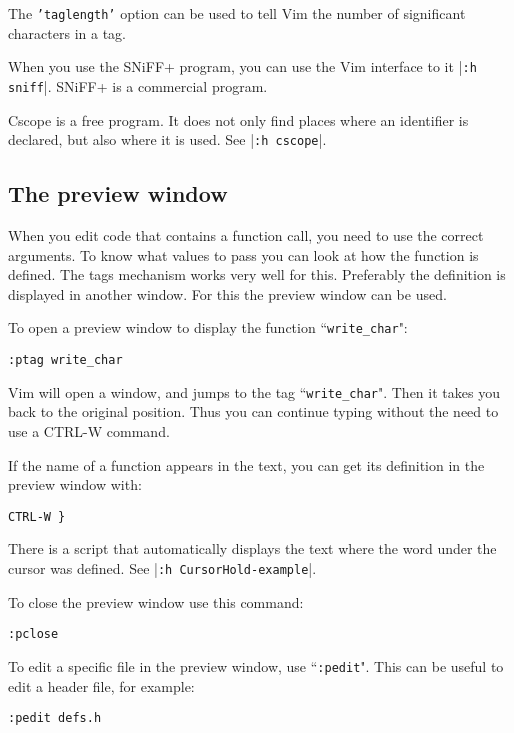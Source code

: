 The \texttt{'taglength'} option can be used to tell Vim the number of significant characters in a tag.

When you use the SNiFF+ program, you can use the Vim interface to it |\texttt{:h sniff}|.
SNiFF+ is a commercial program.

Cscope is a free program.
It does not only find places where an identifier is declared, but also where it is used.
See |\texttt{:h cscope}|.
\subsection{The preview window}
When you edit code that contains a function call, you need to use the correct arguments.
To know what values to pass you can look at how the function is defined.
The tags mechanism works very well for this.
Preferably the definition is displayed in another window.
For this the preview window can be used.

To open a preview window to display the function ``\texttt{write\_char}":

\begin{Verbatim}[samepage=true]
 :ptag write_char
\end{Verbatim}

Vim will open a window, and jumps to the tag ``\texttt{write\_char}".
Then it takes you back to the original position.
Thus you can continue typing without the need to use a CTRL-W command.

If the name of a function appears in the text, you can get its definition in the preview window with:

\begin{Verbatim}[samepage=true]
 CTRL-W }
\end{Verbatim}

There is a script that automatically displays the text where the word under the cursor was defined.
See |\texttt{:h CursorHold-example}|.

To close the preview window use this command:

\begin{Verbatim}[samepage=true]
 :pclose
\end{Verbatim}

To edit a specific file in the preview window, use ``\texttt{:pedit}".
This can be useful to edit a header file, for example:

\begin{Verbatim}[samepage=true]
 :pedit defs.h
\end{Verbatim}

